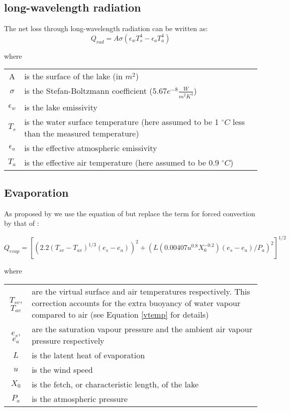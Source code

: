 \documentclass{bmcart}
\begin{document}
\subsection{long-wavelength radiation}
The net loss through long-wavelength radiation can be written as:
\begin{equation}
    Q_{rad} = A\sigma(\epsilon_w T_s^4 - \epsilon_a T_a^4)
\end{equation}

where
\begin{table}[h!]
\begin{tabular}{cp{8cm}}
    A & is the surface of the lake (in $m^2$) \\
    $\sigma$ & is the Stefan-Boltzmann coefficient ($5.67e^{-8} \frac{W}{m^2 K^4}$) \\
    $\epsilon_w$ & is the lake emissivity \\
    $T_s$ & is the water surface temperature (here assumed to be 1 $^{\circ}C$ less than the
    measured temperature) \\
    $\epsilon_a$ & is the effective atmospheric emissivity \\
    $T_a$ & is the effective air temperature (here assumed to be 0.9 $^{\circ}C$) \\ 
\end{tabular}
\end{table}

\subsection{Evaporation}
As proposed by \cite{hurstCraterLakeEnergy2015} we use the equation of
\cite{adamsEvaporationHeatedWater1990} but replace the term for forced
convection by that of \cite{sartoriCriticalReviewEquations2000}:

\begin{equation}
    Q_{evap} = [(2.2(T_{sv} - T_{av})^{1/3}(e_s - e_a))^2 + 
    (L(0.00407u^{0.8}X_0^{-0.2})(e_s - e_a)/P_a)^2]^{1/2}
\end{equation}

where
\begin{table}[h!]
\begin{tabular}{cp{8cm}}
    $T_{sv}$, $T_{av}$ & are the virtual surface and air temperatures respectively.
    This correction accounts for the extra buoyancy of water vapour compared to air
    (see Equation \ref{vtemp} for details) \\
    $e_s$, $e_a$ & are the saturation vapour pressure and the ambient air vapour
    pressure respectively \\
    $L$ & is the latent heat of evaporation \\
    $u$ & is the wind speed \\
    $X_0$ & is the fetch, or characteristic length, of the lake\\
    $P_a$ & is the atmospheric pressure \\
\end{tabular}
\end{table}
\end{document}

